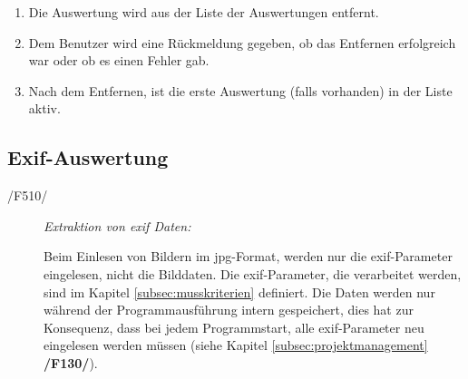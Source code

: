 \begin{description}
\begin{enumerate}
				\item Die Auswertung wird aus der Liste der Auswertungen entfernt.

				\item Dem Benutzer wird eine Rückmeldung gegeben, ob das Entfernen erfolgreich war oder ob es einen Fehler gab.

				\item Nach dem Entfernen, ist die erste Auswertung (falls vorhanden) in der Liste aktiv.

			\end{enumerate}
			
	\end{description}

\subsection{Exif-Auswertung}

	\begin{description}

		\item[/F510/] \textit{Extraktion von \gls{exif} Daten:}\par Beim Einlesen von Bildern im \gls{jpg}-Format, werden nur die \gls{exif}-Parameter eingelesen, nicht die Bilddaten. Die \gls{exif}-Parameter, die verarbeitet werden, sind im Kapitel \ref{subsec:musskriterien} definiert. Die Daten werden nur während der Programmausführung intern gespeichert, dies hat zur Konsequenz, dass bei jedem Programmstart, alle \gls{exif}-Parameter neu eingelesen werden müssen (siehe Kapitel \ref{subsec:projektmanagement} \textbf{/F130/}).
	
	\end{description}